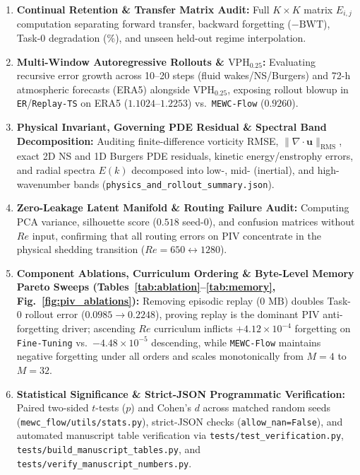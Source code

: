 \documentclass[11pt,a4paper]{article}
\begin{document}
\begin{enumerate}
  \item \textbf{Continual Retention \& Transfer Matrix Audit:} Full $K\times K$ matrix $E_{i,j}$ computation separating forward transfer, backward forgetting ($-\text{BWT}$), Task-0 degradation (\%), and unseen held-out regime interpolation.
  \item \textbf{Multi-Window Autoregressive Rollouts \& $\text{VPH}_{0.25}$:} Evaluating recursive error growth across 10--20 steps (fluid wakes/NS/Burgers) and 72-h atmospheric forecasts (ERA5) alongside $\text{VPH}_{0.25}$, exposing rollout blowup in \texttt{ER}/\texttt{Replay-TS} on ERA5 ($1.1024$--$1.2253$) vs.\ \texttt{MEWC-Flow} ($0.9260$).
  \item \textbf{Physical Invariant, Governing PDE Residual \& Spectral Band Decomposition:} Auditing finite-difference vorticity RMSE, $\|\nabla\cdot\mathbf{u}\|_{\text{RMS}}$, exact 2D NS and 1D Burgers PDE residuals, kinetic energy/enstrophy errors, and radial spectra $E(k)$ decomposed into low-, mid- (inertial), and high-wavenumber bands (\texttt{physics\_and\_rollout\_summary.json}).
  \item \textbf{Zero-Leakage Latent Manifold \& Routing Failure Audit:} Computing PCA variance, silhouette score ($0.518$ seed-0), and confusion matrices without $Re$ input, confirming that all routing errors on PIV concentrate in the physical shedding transition ($Re=650 \leftrightarrow 1280$).
  \item \textbf{Component Ablations, Curriculum Ordering \& Byte-Level Memory Pareto Sweeps (Tables~\ref{tab:ablation}--\ref{tab:memory}, Fig.~\ref{fig:piv_ablations}):} Removing episodic replay ($0\text{ MB}$) doubles Task-0 rollout error ($0.0985 \to 0.2248$), proving replay is the dominant PIV anti-forgetting driver; ascending $Re$ curriculum inflicts $+4.12\times 10^{-4}$ forgetting on \texttt{Fine-Tuning} vs.\ $-4.48\times 10^{-5}$ descending, while \texttt{MEWC-Flow} maintains negative forgetting under all orders and scales monotonically from $M=4$ to $M=32$.
  \item \textbf{Statistical Significance \& Strict-JSON Programmatic Verification:} Paired two-sided $t$-tests ($p$) and Cohen's $d$ across matched random seeds (\texttt{mewc\_flow/utils/stats.py}), strict-JSON checks (\texttt{allow\_nan=False}), and automated manuscript table verification via \texttt{tests/test\_verification.py}, \texttt{tests/build\_manuscript\_tables.py}, and \texttt{tests/\allowbreak verify\_\allowbreak manuscript\_\allowbreak numbers.py}.
\end{enumerate}
\end{document}
